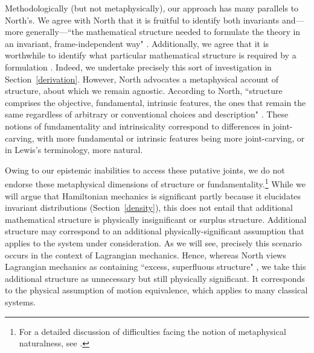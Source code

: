\documentclass[letterpaper]{article}
\begin{document}
Methodologically (but not metaphysically), our approach has many parallels to North's. We agree with North that it is fruitful to identify both invariants and---more generally---``the mathematical structure needed to formulate the theory in an invariant, frame-independent way" \parencites*[65]{North}. Additionally, we agree that it is worthwhile to identify what particular mathematical structure is required by a formulation \parencites[78]{North}. Indeed, we undertake precisely this sort of investigation in Section~\ref{derivation}. However, North advocates a metaphysical account of structure, about which we remain agnostic. According to North, ``structure comprises the objective, fundamental, intrinsic features, the ones that remain the same regardless of arbitrary or conventional choices and description" \parencites*[66]{North}. These notions of fundamentality and intrinsicality correspond to differences in joint-carving, with more fundamental or intrinsic features being more joint-carving, or in Lewis's \parencites*[]{Lewis1983} terminology, more natural. 

Owing to our epistemic inabilities to access these putative joints, we do not endorse these metaphysical dimensions of structure or fundamentality.\footnote{For a detailed discussion of difficulties facing the notion of metaphysical naturalness, see \textcites[]{Dorr_Hawthorne}.} While we will argue that Hamiltonian mechanics is significant partly because it elucidates invariant distributions (Section~\ref{density}), this does not entail that additional mathematical structure is physically insignificant or surplus structure. Additional structure may correspond to an additional physically-significant assumption that applies to the system under consideration. As we will see, precisely this scenario occurs in the context of Lagrangian mechanics. Hence, whereas North views Lagrangian mechanics as containing ``excess, superfluous structure" \parencites*[75]{North}, we take this additional structure as unnecessary but still physically significant. It corresponds to the physical assumption of motion equivalence, which applies to many classical systems. 
\end{document}

